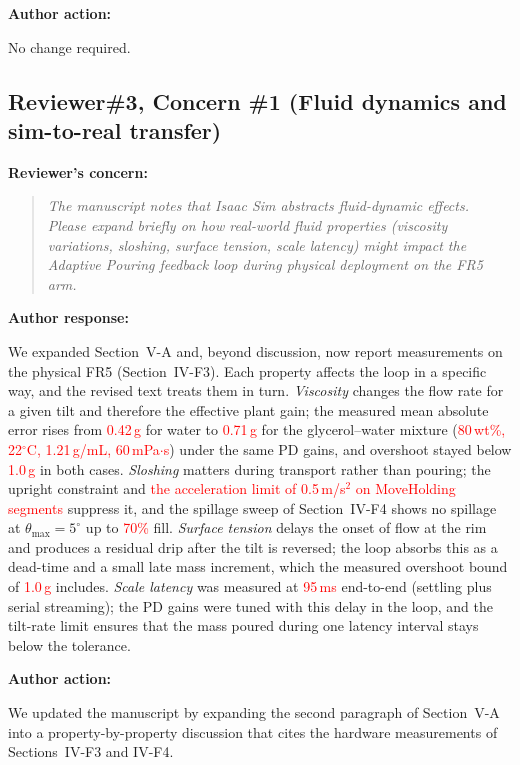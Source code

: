 \documentclass[11pt]{article}
\newcommand{\nd}[1]{\textcolor{red}{#1}}
\newif\ifshowstatus
\newcommand{\statusline}[2]{\ifshowstatus\par\noindent\textcolor{status#1}{\textbf{Status: \MakeUppercase{#1}.} #2}\par\smallskip\fi}
\newenvironment{concern}[3][pending]{\subsection*{\ifshowstatus\textcolor{status#1}{#2}\else#2\fi}\statusline{#1}{#3}\textbf{Reviewer's concern:}\begin{quote}\itshape}{\end{quote}}
\newenvironment{response}{\textbf{Author response:}\par\smallskip}{\par\medskip}
\newenvironment{action}{\textbf{Author action:}\par\smallskip}{\par\bigskip\noindent\hrulefill\par\bigskip}
\begin{document}
\begin{action}
No change required.
\end{action}

\begin{concern}[pending]{Reviewer\#3, Concern \#1 (Fluid dynamics and sim-to-real transfer)}{Needs the A3 and A4 numbers; the qualitative property-by-property discussion can be written now.}
The manuscript notes that Isaac Sim abstracts fluid-dynamic effects.
Please expand briefly on how real-world fluid properties (viscosity variations, sloshing, surface tension, scale latency) might impact the Adaptive Pouring feedback loop during physical deployment on the FR5 arm.
\end{concern}

\begin{response}
We expanded Section~V-A and, beyond discussion, now report measurements on the physical FR5 (Section~IV-F3).
Each property affects the loop in a specific way, and the revised text treats them in turn.
\emph{Viscosity} changes the flow rate for a given tilt and therefore the effective plant gain; the measured mean absolute error rises from \nd{0.42\,g} for water to \nd{0.71\,g} for the glycerol--water mixture (\nd{80\,wt\%, 22$^\circ$C, 1.21\,g/mL, 60\,mPa$\cdot$s}) under the same PD gains, and overshoot stayed below \nd{1.0\,g} in both cases.
\emph{Sloshing} matters during transport rather than pouring; the upright constraint and \nd{the acceleration limit of 0.5\,m/s$^2$ on MoveHolding segments} suppress it, and the spillage sweep of Section~IV-F4 shows no spillage at $\theta_{\max}=5^\circ$ up to \nd{70\%} fill.
\emph{Surface tension} delays the onset of flow at the rim and produces a residual drip after the tilt is reversed; the loop absorbs this as a dead-time and a small late mass increment, which the measured overshoot bound of \nd{1.0\,g} includes.
\emph{Scale latency} was measured at \nd{95\,ms} end-to-end (settling plus serial streaming); the PD gains were tuned with this delay in the loop, and the tilt-rate limit ensures that the mass poured during one latency interval stays below the tolerance.
\end{response}

\begin{action}
We updated the manuscript by expanding the second paragraph of Section~V-A into a property-by-property discussion that cites the hardware measurements of Sections~IV-F3 and IV-F4.
\end{action}
\end{document}
